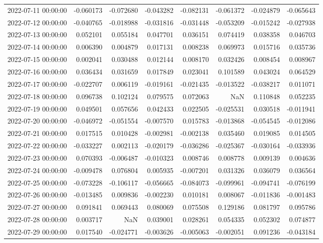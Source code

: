 \begin{tabular}{lrrrrrrr}
2022-07-11 00:00:00 & -0.060173 & -0.072680 & -0.043282 & -0.082131 & -0.061372 & -0.024879 & -0.065643 \\
2022-07-12 00:00:00 & -0.040765 & -0.018988 & -0.031816 & -0.031448 & -0.053209 & -0.015242 & -0.027938 \\
2022-07-13 00:00:00 & 0.052101 & 0.055184 & 0.047701 & 0.036151 & 0.074419 & 0.038358 & 0.046703 \\
2022-07-14 00:00:00 & 0.006390 & 0.004879 & 0.017131 & 0.008238 & 0.069973 & 0.015716 & 0.035736 \\
2022-07-15 00:00:00 & 0.002041 & 0.030488 & 0.012144 & 0.008170 & 0.032426 & 0.008454 & 0.008967 \\
2022-07-16 00:00:00 & 0.036434 & 0.031659 & 0.017849 & 0.023041 & 0.101589 & 0.043024 & 0.064529 \\
2022-07-17 00:00:00 & -0.022707 & 0.006119 & -0.019161 & -0.021435 & -0.013522 & -0.038217 & 0.011071 \\
2022-07-18 00:00:00 & 0.096738 & 0.102124 & 0.079575 & 0.072063 & NaN & 0.110848 & 0.052235 \\
2022-07-19 00:00:00 & 0.049501 & 0.057656 & 0.042433 & 0.022505 & -0.025531 & 0.030518 & -0.011941 \\
2022-07-20 00:00:00 & -0.046972 & -0.051554 & -0.007570 & 0.015783 & -0.013868 & -0.054545 & -0.012086 \\
2022-07-21 00:00:00 & 0.017515 & 0.010428 & -0.002981 & -0.002138 & 0.035460 & 0.019085 & 0.014505 \\
2022-07-22 00:00:00 & -0.033227 & 0.002113 & -0.020179 & -0.036286 & -0.025367 & -0.030164 & -0.033936 \\
2022-07-23 00:00:00 & 0.070393 & -0.006487 & -0.010323 & 0.008746 & 0.008778 & 0.009139 & 0.004636 \\
2022-07-24 00:00:00 & -0.009478 & 0.076804 & 0.005935 & -0.007201 & 0.031326 & 0.036079 & 0.036564 \\
2022-07-25 00:00:00 & -0.073228 & -0.106117 & -0.056665 & -0.084073 & -0.099961 & -0.094741 & -0.076199 \\
2022-07-26 00:00:00 & -0.013485 & 0.009836 & -0.002230 & 0.010181 & 0.008067 & -0.011836 & -0.001483 \\
2022-07-27 00:00:00 & 0.091841 & 0.069443 & 0.080069 & 0.075508 & 0.129186 & 0.081797 & 0.095786 \\
2022-07-28 00:00:00 & 0.003717 & NaN & 0.039001 & 0.028261 & 0.054335 & 0.052302 & 0.074877 \\
2022-07-29 00:00:00 & 0.017540 & -0.024771 & -0.003626 & -0.005063 & -0.002051 & 0.091236 & -0.043184 \\

\end{tabular}
